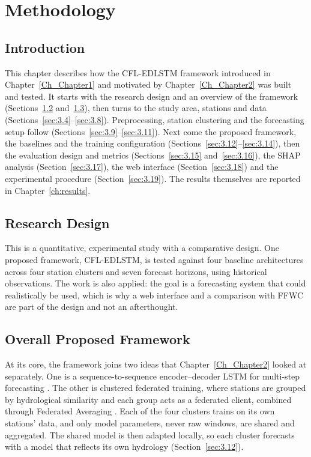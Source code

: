 \chapter{Methodology}
\label{ch:methodology}

\section{Introduction}
\label{sec:3.1}

This chapter describes how the CFL-EDLSTM framework introduced in
Chapter~\ref{Ch_Chapter1} and motivated by Chapter~\ref{Ch_Chapter2} was built
and tested. It starts with the research design and an overview of the framework
(Sections~\ref{sec:3.2} and~\ref{sec:3.3}), then turns to the study area,
stations and data (Sections~\ref{sec:3.4}--\ref{sec:3.8}). Preprocessing,
station clustering and the forecasting setup follow
(Sections~\ref{sec:3.9}--\ref{sec:3.11}). Next come the proposed framework, the
baselines and the training configuration
(Sections~\ref{sec:3.12}--\ref{sec:3.14}), then the evaluation design and
metrics (Sections~\ref{sec:3.15} and~\ref{sec:3.16}), the SHAP analysis
(Section~\ref{sec:3.17}), the web interface (Section~\ref{sec:3.18}) and the
experimental procedure (Section~\ref{sec:3.19}). The results themselves are
reported in Chapter~\ref{ch:results}.

\section{Research Design}
\label{sec:3.2}

This is a quantitative, experimental study with a comparative design. One
proposed framework, CFL-EDLSTM, is tested against four baseline architectures
across four station clusters and seven forecast horizons, using historical
observations. The work is also applied: the goal is a forecasting system that
could realistically be used, which is why a web interface and a comparison with
FFWC are part of the design and not an afterthought.

\section{Overall Proposed Framework}
\label{sec:3.3}

At its core, the framework joins two ideas that Chapter~\ref{Ch_Chapter2}
looked at separately. One is a sequence-to-sequence encoder--decoder LSTM for
multi-step forecasting \cite{Kao2020,Cui2022}. The other is clustered federated
training, where stations are grouped by hydrological similarity and each group
acts as a federated client, combined through Federated Averaging
\cite{McMahan2017,Ghosh2021,Harshvardhan2022}. Each of the four clusters trains
on its own stations' data, and only model parameters, never raw windows, are
shared and aggregated. The shared model is then adapted locally, so each
cluster forecasts with a model that reflects its own hydrology
(Section~\ref{sec:3.12}).

